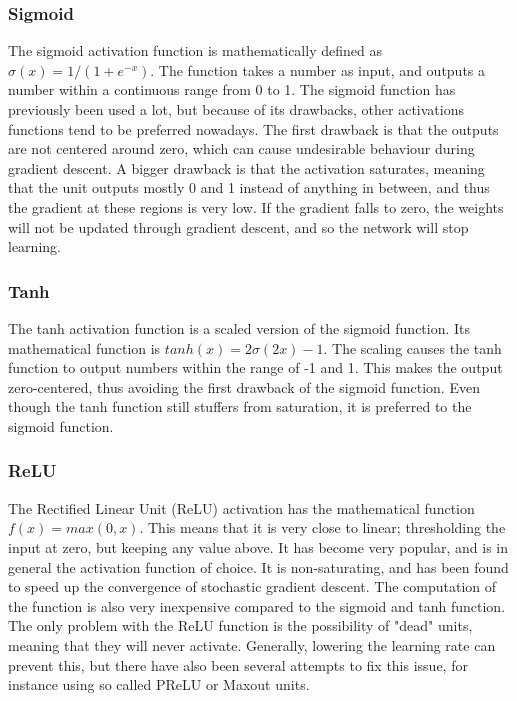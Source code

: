 \subsubsection{Sigmoid}

The sigmoid activation function is mathematically defined as $\sigma(x) = 1/(1 + e^{-x})$. The function takes a number as input, and outputs a number within a continuous range from 0 to 1. The sigmoid function has previously been used a lot, but because of its drawbacks, other activations functions tend to be preferred nowadays. The first drawback is that the outputs are not centered around zero, which can cause undesirable behaviour during gradient descent. A bigger drawback is that the activation saturates, meaning that the unit outputs mostly 0 and 1 instead of anything in between, and thus the gradient at these regions is very low. If the gradient falls to zero, the weights will not be updated through gradient descent, and so the network will stop learning.

\subsubsection{Tanh}

The tanh activation function is a scaled version of the sigmoid function. Its mathematical function is $tanh(x) = 2\sigma(2x) - 1$. The scaling causes the tanh function to output numbers within the range of -1 and 1. This makes the output zero-centered, thus avoiding the first drawback of the sigmoid function. Even though the tanh function still stuffers from saturation, it is preferred to the sigmoid function.

\subsubsection{ReLU}

The Rectified Linear Unit (ReLU) activation has the mathematical function $f(x) = max(0,x)$. This means that it is very close to linear; thresholding the input at zero, but keeping any value above. It has become very popular, and is in general the activation function of choice. It is non-saturating, and has been found to speed up the convergence of stochastic gradient descent. The computation of the function is also very inexpensive compared to the sigmoid and tanh function. The only problem with the ReLU function is the possibility of "dead" units, meaning that they will never activate. Generally, lowering the learning rate can prevent this, but there have also been several attempts to fix this issue, for instance using so called PReLU or Maxout units.

